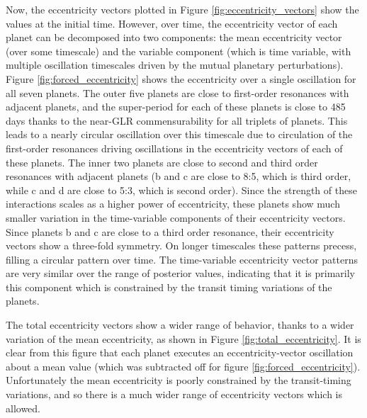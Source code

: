 \documentclass[twocolumn]{aastex63}
\begin{document}
Now, the eccentricity vectors plotted in Figure \ref{fig:eccentricity_vectors} show the
values at the initial time. However, over time, the eccentricity vector of each planet can be decomposed into two components: the mean eccentricity vector (over some timescale) and the variable component (which is time variable, with multiple oscillation timescales driven by the mutual planetary perturbations).   Figure \ref{fig:forced_eccentricity}
shows the eccentricity over a single oscillation for all seven planets.  The outer five
planets are close to first-order resonances with adjacent planets, and the super-period
for each of these planets is close to 485 days thanks to the near-GLR commensurability
for all triplets of planets.  This leads to a nearly circular oscillation over this timescale
due to circulation of the first-order resonances driving oscillations in the eccentricity
vectors of each of these planets.  The inner two planets are close to second and third
order resonances with adjacent planets (b and c are close to 8:5, which is third order,
while c and d are close to 5:3, which is second order).  Since the strength of these
interactions scales as a higher power of eccentricity, these planets show much smaller variation
in the time-variable components of their eccentricity vectors.  Since planets b and c are 
close to a third order resonance,
their eccentricity vectors show a three-fold symmetry.  On longer timescales these patterns
precess, filling a circular pattern over time.  The time-variable eccentricity vector patterns are
very similar over the range of posterior values, indicating that it is primarily this
component which is constrained by the transit timing variations of the planets.

The total eccentricity vectors show a wider range of behavior, thanks to a wider variation
of the mean eccentricity, as shown in Figure \ref{fig:total_eccentricity}.  It is clear
from this figure that each planet executes an eccentricity-vector oscillation about a
mean value (which was subtracted off for figure \ref{fig:forced_eccentricity}).  Unfortunately the mean eccentricity is poorly constrained by the transit-timing
variations, and so there is a much wider range of eccentricity vectors which is allowed.
\end{document}
